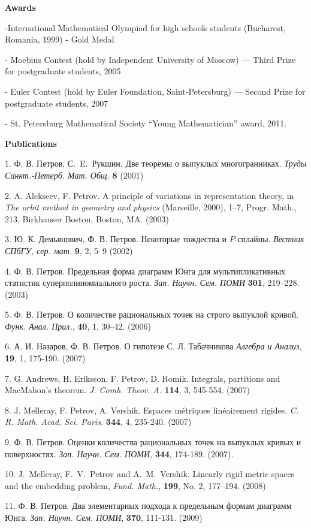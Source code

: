 \documentclass[12pt,russian]{article}
\begin{document}
\textbf{Awards}

-International Mathematical Olympiad for high
schools students (Bucharest, Romania, 1999) - Gold Medal

- Moebius Contest (hold by Independent University
of Moscow) --- Third Prize for postgraduate students, 2005

- Euler Contest (hold by Euler Foundation, Saint-Petersburg) --- Second Prize for
postgraduate students, 2007

- St. Petersburg Mathematical Society ``Young Mathematician'' award,
2011.

\textbf{Publications}


1. Ф. В. Петров, С.~E.~Рукшин. Две теоремы о выпуклых
многогранниках. {\it Труды Санкт.-Петерб. Мат. Общ.} {\bf 8} (2001)


2. A. Alekseev, F. Petrov. A principle of variations in
  representation theory, in {\it The orbit method in geometry and
  physics} (Marseille, 2000), 1--7, Progr. Math., 213,
  Birkhauser Boston, Boston, MA. (2003)

3. Ю. К. Демьянович, Ф. В. Петров.
Некоторые
тождества и $P$-сплайны. {\it Вестник СПбГУ, сер. мат.
} \textbf{9}, 2, 5--9 (2002)

4. Ф. В. Петров. Предельная форма диаграмм Юнга
для мультипликативных статистик суперполиномиального роста.
  {\it Зап. Научн. Сем. ПОМИ} \textbf{301}, 219--228. (2003)

5. Ф. В. Петров. О количестве рациональных точек на строго выпуклой кривой.
{\it Функ. Анал. Прил.}, {\bf 40}, 1, 30--42. (2006)

6. А. И. Назаров, Ф. В. Петров. О гипотезе С. Л. Табачникова
{\it Алгебра и Анализ}, \textbf{19}, 1, 175-190. (2007)

7. G. Andrews, H. Eriksson, F. Petrov, D. Romik. Integrals, partitions
and MacMahon's theorem. {\it J. Comb. Theor. A.}
\textbf{114}, 3, 545-554. (2007)

8. J. Melleray, F. Petrov, A. Vershik. Espaces m\'{e}triques
lin\'{e}airement rigides. {\it C. R. Math. Acad. Sci.
Paris.} \textbf{344}, 4, 235-240. (2007)


9. Ф. В. Петров. Оценки количества рациональных точек на выпуклых
кривых и поверхностях.
{\it Зап. Научн. Сем. ПОМИ}, {\bf 344}, 174-189. (2007).

10. J.~Melleray, F.~V.~Petrov and  A.~M.~Vershik.
Linearly rigid metric spaces and the embedding problem,
{\it Fund. Math.}, {\bf 199}, No. 2, 177--194. (2008)

11. Ф. В. Петров. Два элементарных подхода к предельным формам диаграмм Юнга.
{\it Зап. Научн. Сем. ПОМИ}, {\bf 370}, 111-131. (2009)
\end{document}
